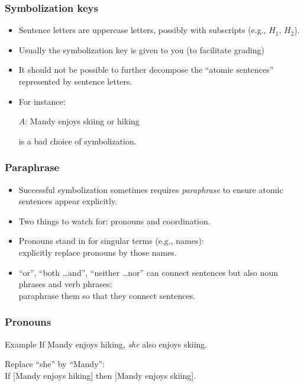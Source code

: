 \begin{frame}
  \frametitle{Symbolization keys}

  \begin{itemize}[<+->]
  \item Sentence letters are uppercase letters, possibly with subscripts
  (e.g., $H_1$, $H_2$).
  \item Usually the symbolization key is given to you \footnotesize{(to facilitate grading)}
  \item It should not be possible to further decompose the ``atomic
  sentences'' represented by sentence letters.

  \item[] For instance:
  \centerline{$A$: Mandy enjoys skiing or hiking}
  is a bad choice of symbolization.
  \end{itemize}
\end{frame}

\begin{frame}
  \frametitle{Paraphrase}

  \begin{itemize}[<+->]
  \item Successful symbolization sometimes requires \emph{paraphrase} to
  ensure atomic sentences appear explicitly.
  \item Two things to watch for: pronouns and coordination.
  \item Pronouns stand in for singular terms (e.g., names): \\ explicitly replace
  pronouns by those names.
  \item ``or'', ``both \dots and'', ``neither \dots nor'' can connect sentences but
  also noun phrases and verb phrases: \\ paraphrase them so that they connect
  sentences.
  \end{itemize}
\end{frame}

\begin{frame}
  \frametitle{Pronouns}

  \begin{block}{Example}
    If Mandy enjoys hiking, \emph{she} also enjoys skiing.

    Replace ``she'' by ``Mandy'':\\
    If [Mandy enjoys hiking] then [Mandy enjoys skiing].
  \end{block}
\end{frame}

